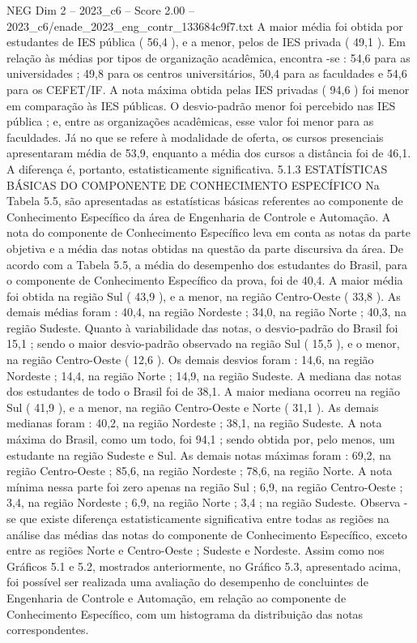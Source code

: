 \begin{textsample}{NEG Dim 2 – 2023\_c6 – Score 2.00 – 2023\_c6/enade\_2023\_eng\_contr\_133684c9f7.txt}
A maior média foi obtida por estudantes de IES pública ( 56,4 ), e a menor, pelos de IES privada ( 49,1 ).
Em relação às médias por tipos de organização acadêmica, encontra -se : 54,6 para as universidades ; 49,8 para os centros universitários, 50,4 para as faculdades e 54,6 para os CEFET/IF.
A nota máxima obtida pelas IES privadas ( 94,6 ) foi menor em comparação às IES públicas.
O desvio-padrão menor foi percebido nas IES pública ; e, entre as organizações acadêmicas, esse valor foi menor para as faculdades.
Já no que se refere à modalidade de oferta, os cursos presenciais apresentaram média de 53,9, enquanto a média dos cursos a distância foi de 46,1.
A diferença é, portanto, estatisticamente significativa. 5.1.3 ESTATÍSTICAS BÁSICAS DO COMPONENTE DE CONHECIMENTO ESPECÍFICO Na Tabela 5.5, são apresentadas as estatísticas básicas referentes ao componente de Conhecimento Específico da área de Engenharia de Controle e Automação.
A nota do componente de Conhecimento Específico leva em conta as notas da parte objetiva e a média das notas obtidas na questão da parte discursiva da área.
De acordo com a Tabela 5.5, a média do desempenho dos estudantes do Brasil, para o componente de Conhecimento Específico da prova, foi de 40,4.
A maior média foi obtida na região Sul ( 43,9 ), e a menor, na região Centro-Oeste ( 33,8 ).
As demais médias foram : 40,4, na região Nordeste ; 34,0, na região Norte ; 40,3, na região Sudeste.
Quanto à variabilidade das notas, o desvio-padrão do Brasil foi 15,1 ; sendo o maior desvio-padrão observado na região Sul ( 15,5 ), e o menor, na região Centro-Oeste ( 12,6 ).
Os demais desvios foram : 14,6, na região Nordeste ; 14,4, na região Norte ; 14,9, na região Sudeste.
A mediana das notas dos estudantes de todo o Brasil foi de 38,1.
A maior mediana ocorreu na região Sul ( 41,9 ), e a menor, na região Centro-Oeste e Norte ( 31,1 ).
As demais medianas foram : 40,2, na região Nordeste ; 38,1, na região Sudeste.
A nota máxima do Brasil, como um todo, foi 94,1 ; sendo obtida por, pelo menos, um estudante na região Sudeste e Sul.
As demais notas máximas foram : 69,2, na região Centro-Oeste ; 85,6, na região Nordeste ; 78,6, na região Norte.
A nota mínima nessa parte foi zero apenas na região Sul ; 6,9, na região Centro-Oeste ; 3,4, na região Nordeste ; 6,9, na região Norte ; 3,4 ; na região Sudeste.
Observa -se que existe diferença estatisticamente significativa entre todas as regiões na análise das médias das notas do componente de Conhecimento Específico, exceto entre as regiões Norte e Centro-Oeste ; Sudeste e Nordeste.
Assim como nos Gráficos 5.1 e 5.2, mostrados anteriormente, no Gráfico 5.3, apresentado acima, foi possível ser realizada uma avaliação do desempenho de concluintes de Engenharia de Controle e Automação, em relação ao componente de Conhecimento Específico, com um histograma da distribuição das notas correspondentes.

\end{textsample}
